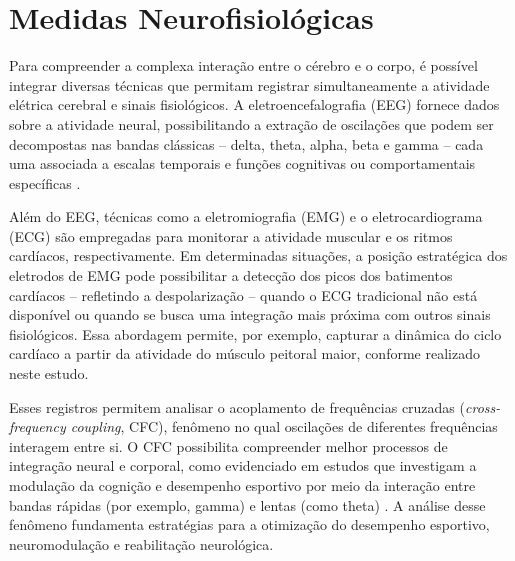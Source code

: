 \section{Medidas Neurofisiológicas}
Para compreender a complexa interação entre o cérebro e o corpo, é possível integrar diversas técnicas que permitam registrar simultaneamente a atividade elétrica cerebral e sinais fisiológicos. A eletroencefalografia (EEG) fornece dados sobre a atividade neural, possibilitando a extração de oscilações que podem ser decompostas nas bandas clássicas – delta, theta, alpha, beta e gamma – cada uma associada a escalas temporais e funções cognitivas ou comportamentais específicas \cite{cohen2017where, bullmore2009complex}.

Além do EEG, técnicas como a eletromiografia (EMG) e o eletrocardiograma (ECG) são empregadas para monitorar a atividade muscular e os ritmos cardíacos, respectivamente. Em determinadas situações, a posição estratégica dos eletrodos de EMG pode possibilitar a detecção dos picos dos batimentos cardíacos – refletindo a despolarização – quando o ECG tradicional não está disponível ou quando se busca uma integração mais próxima com outros sinais fisiológicos. Essa abordagem permite, por exemplo, capturar a dinâmica do ciclo cardíaco a partir da atividade do músculo peitoral maior, conforme realizado neste estudo.

Esses registros permitem analisar o acoplamento de frequências cruzadas (\textit{cross-frequency coupling}, CFC), fenômeno no qual oscilações de diferentes frequências interagem entre si. O CFC possibilita compreender melhor processos de integração neural e corporal, como evidenciado em estudos que investigam a modulação da cognição e desempenho esportivo por meio da interação entre bandas rápidas (por exemplo, gamma) e lentas (como theta) \cite{criscuolo2022cognition, cohen2017where}. A análise desse fenômeno fundamenta estratégias para a otimização do desempenho esportivo, neuromodulação e reabilitação neurológica.